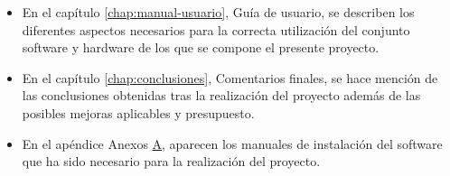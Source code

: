 \begin{itemize}
\item En el capítulo \ref{chap:manual-usuario}, Guía de usuario, se describen los diferentes aspectos necesarios para la correcta utilización del conjunto software y hardware de los que se compone el presente proyecto.

\item En el capítulo \ref{chap:conclusiones}, Comentarios finales, se hace mención de las conclusiones obtenidas tras la realización del proyecto además de las posibles mejoras aplicables y presupuesto.

\item En el apéndice Anexos  \hyperref[appendix:anexos]{A}, aparecen los manuales de instalación del software que ha sido necesario para la realización del proyecto.

\end{itemize}
